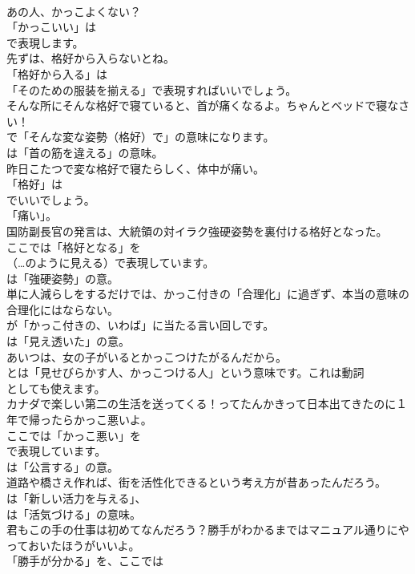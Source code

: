 \documentclass[8pt]{extreport}
\begin{document}
\begin{CJK}{UTF8}{min}
\\	あの人、かっこよくない？ 
\\	「かっこいい」は 
\\	で表現します。	
\\	先ずは、格好から入らないとね。 
\\	「格好から入る」は
\\	「そのための服装を揃える」で表現すればいいでしょう。	
\\	そんな所にそんな格好で寝ていると、首が痛くなるよ。ちゃんとベッドで寝なさい！ 
\\	で「そんな変な姿勢（格好）で」の意味になります。
\\	は「首の筋を違える」の意味。	
\\	昨日こたつで変な格好で寝たらしく、体中が痛い。 
\\	「格好」は
\\	でいいでしょう。
\\	「痛い」。	
\\	国防副長官の発言は、大統領の対イラク強硬姿勢を裏付ける格好となった。 
\\	ここでは「格好となる」を 
\\	（…のように見える）で表現しています。
\\	は「強硬姿勢」の意。	
\\	単に人減らしをするだけでは、かっこ付きの「合理化」に過ぎず、本当の意味の合理化にはならない。 
\\	が「かっこ付きの、いわば」に当たる言い回しです。
\\	は「見え透いた」の意。	
\\	あいつは、女の子がいるとかっこつけたがるんだから。 
\\	とは「見せびらかす人、かっこつける人」という意味です。これは動詞
\\	としても使えます。	
\\	カナダで楽しい第二の生活を送ってくる！ってたんかきって日本出てきたのに１年で帰ったらかっこ悪いよ。 
\\	ここでは「かっこ悪い」を 
\\	で表現しています。
\\	は「公言する」の意。	
\\	道路や橋さえ作れば、街を活性化できるという考え方が昔あったんだろう。 
\\	は「新しい活力を与える」、
\\	は「活気づける」の意味。	
\\	君もこの手の仕事は初めてなんだろう？勝手がわかるまではマニュアル通りにやっておいたほうがいいよ。 
\\	「勝手が分かる」を、ここでは

\end{CJK}
\end{document}

